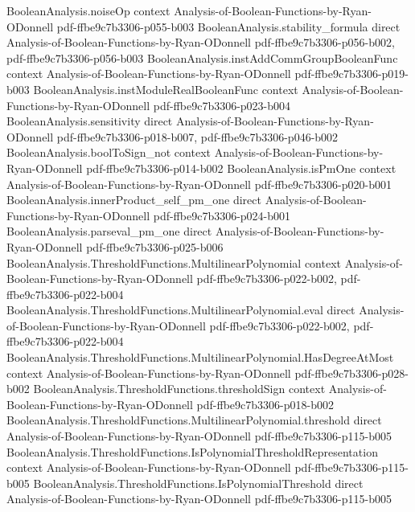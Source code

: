 \begin{theorem}
\proofstep
  {BooleanAnalysis.noiseOp}
  {context}
  {Analysis-of-Boolean-Functions-by-Ryan-ODonnell}
  {pdf-ffbe9c7b3306-p055-b003}
\proofstep
  {BooleanAnalysis.stability_formula}
  {direct}
  {Analysis-of-Boolean-Functions-by-Ryan-ODonnell}
  {pdf-ffbe9c7b3306-p056-b002,
    pdf-ffbe9c7b3306-p056-b003}
\proofstep
  {BooleanAnalysis.instAddCommGroupBooleanFunc}
  {context}
  {Analysis-of-Boolean-Functions-by-Ryan-ODonnell}
  {pdf-ffbe9c7b3306-p019-b003}
\proofstep
  {BooleanAnalysis.instModuleRealBooleanFunc}
  {context}
  {Analysis-of-Boolean-Functions-by-Ryan-ODonnell}
  {pdf-ffbe9c7b3306-p023-b004}
\proofstep
  {BooleanAnalysis.sensitivity}
  {direct}
  {Analysis-of-Boolean-Functions-by-Ryan-ODonnell}
  {pdf-ffbe9c7b3306-p018-b007,
    pdf-ffbe9c7b3306-p046-b002}
\proofstep
  {BooleanAnalysis.boolToSign_not}
  {context}
  {Analysis-of-Boolean-Functions-by-Ryan-ODonnell}
  {pdf-ffbe9c7b3306-p014-b002}
\proofstep
  {BooleanAnalysis.isPmOne}
  {context}
  {Analysis-of-Boolean-Functions-by-Ryan-ODonnell}
  {pdf-ffbe9c7b3306-p020-b001}
\proofstep
  {BooleanAnalysis.innerProduct_self_pm_one}
  {direct}
  {Analysis-of-Boolean-Functions-by-Ryan-ODonnell}
  {pdf-ffbe9c7b3306-p024-b001}
\proofstep
  {BooleanAnalysis.parseval_pm_one}
  {direct}
  {Analysis-of-Boolean-Functions-by-Ryan-ODonnell}
  {pdf-ffbe9c7b3306-p025-b006}
\proofstep
  {BooleanAnalysis.ThresholdFunctions.MultilinearPolynomial}
  {context}
  {Analysis-of-Boolean-Functions-by-Ryan-ODonnell}
  {pdf-ffbe9c7b3306-p022-b002,
    pdf-ffbe9c7b3306-p022-b004}
\proofstep
  {BooleanAnalysis.ThresholdFunctions.MultilinearPolynomial.eval}
  {direct}
  {Analysis-of-Boolean-Functions-by-Ryan-ODonnell}
  {pdf-ffbe9c7b3306-p022-b002,
    pdf-ffbe9c7b3306-p022-b004}
\proofstep
  {BooleanAnalysis.ThresholdFunctions.MultilinearPolynomial.HasDegreeAtMost}
  {context}
  {Analysis-of-Boolean-Functions-by-Ryan-ODonnell}
  {pdf-ffbe9c7b3306-p028-b002}
\proofstep
  {BooleanAnalysis.ThresholdFunctions.thresholdSign}
  {context}
  {Analysis-of-Boolean-Functions-by-Ryan-ODonnell}
  {pdf-ffbe9c7b3306-p018-b002}
\proofstep
  {BooleanAnalysis.ThresholdFunctions.MultilinearPolynomial.threshold}
  {direct}
  {Analysis-of-Boolean-Functions-by-Ryan-ODonnell}
  {pdf-ffbe9c7b3306-p115-b005}
\proofstep
  {BooleanAnalysis.ThresholdFunctions.IsPolynomialThresholdRepresentation}
  {context}
  {Analysis-of-Boolean-Functions-by-Ryan-ODonnell}
  {pdf-ffbe9c7b3306-p115-b005}
\proofstep
  {BooleanAnalysis.ThresholdFunctions.IsPolynomialThreshold}
  {direct}
  {Analysis-of-Boolean-Functions-by-Ryan-ODonnell}
  {pdf-ffbe9c7b3306-p115-b005}

\end{theorem}
